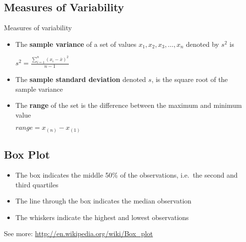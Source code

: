 \documentclass[12pt]{report}
\begin{document}
    \subsection{Measures of Variability}
      Measures of variability
      \begin{itemize}
        \item The \textbf{sample variance} of a set of values $x_1, x_2,
          x_3,\ldots, x_n$ denoted by $s^2$ is
          \begin{center}
            $s^2 = \frac{\sum_{i=1}^{n}{(x_i-\bar{x})}^2}{n-1}$
          \end{center}
        \item The \textbf{sample standard deviation} denoted $s$, is the square
          root of the sample variance
        \item The \textbf{range} of the set is the difference between the
          maximum and minimum value
          \begin{center}
            $range = x_{(n)} - x_{(1)}$
          \end{center}
      \end{itemize}

    \subsection{Box Plot}
      \begin{itemize}
        \item The box indicates the middle 50\% of the observations, i.e.\ the
          second and third quartiles
        \item The line through the box indicates the median observation
        \item The whiskers indicate the highest and lowest observations
      \end{itemize}
      See more: \url{http://en.wikipedia.org/wiki/Box_plot}
\end{document}
